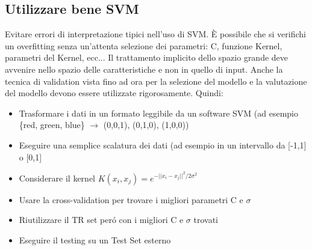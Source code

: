 \documentclass{article}
\begin{document}
\subsection{Utilizzare bene SVM}
Evitare errori di interpretazione tipici nell'uso di SVM. È possibile che si verifichi un overfitting senza un'attenta selezione dei parametri: C, funzione Kernel, parametri del Kernel, ecc... Il trattamento implicito dello spazio grande deve avvenire nello spazio delle caratteristiche e non in quello di input. Anche la tecnica di validation vista fino ad ora per la selezione del modello e la valutazione del modello devono essere utilizzate rigorosamente.\clearpage
Quindi:
\begin{itemize}
    \item Trasformare i dati in un formato leggibile da un software SVM (ad esempio \{red, green, blue\} $\rightarrow$ (0,0,1), (0,1,0), (1,0,0))
    \item Eseguire una semplice scalatura dei dati (ad esempio in un intervallo da [-1,1] o [0,1]
    \item Considerare il kernel $K(x_i,x_j)=e^{-||x_i-x_j||^2/2\sigma^2}$
    \item Usare la cross-validation per trovare i migliori parametri C e $\sigma$
    \item Riutilizzare il TR set peró con i migliori C e $\sigma$ trovati
    \item Eseguire il testing su un Test Set esterno
\end{itemize}




%
%
\end{document}
